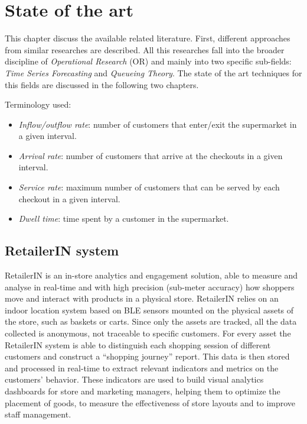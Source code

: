 \chapter{State of the art}
\label{cha:state_of_art}

This chapter discuss the available related literature. First, different approaches from similar researches are described. All this researches fall into the broader discipline of \emph{Operational Research} (OR) and mainly into two specific sub-fields: \emph{Time Series Forecasting} and \emph{Queueing Theory}. The state of the art techniques for this fields are discussed in the following two chapters.

Terminology used:
\begin{itemize}
  \item \emph{Inflow/outflow rate}: number of customers that enter/exit the supermarket in a given interval.
  \item \emph{Arrival rate}: number of customers that arrive at the checkouts in a given interval.
  \item \emph{Service rate}: maximum number of customers that can be served by each checkout in a given interval.
  \item \emph{Dwell time}: time spent by a customer in the supermarket.
\end{itemize}

\section{RetailerIN system}
\label{sec:retailerin_system}
RetailerIN is an in-store analytics and engagement solution, able to measure and analyse in real-time and with high precision (sub-meter accuracy) how shoppers move and interact with products in a physical store. RetailerIN relies on an indoor location system based on BLE sensors mounted on the physical assets of the store, such as baskets or carts. Since only the assets are tracked, all the data collected is anonymous, not traceable to specific customers. For every asset the RetailerIN system is able to distinguish each shopping session of different customers and construct a “shopping journey” report. This data is then stored and processed in real-time to extract relevant indicators and metrics on the customers’ behavior. These indicators are used to build visual analytics dashboards for store and marketing managers, helping them to optimize the placement of goods, to measure the effectiveness of store layouts and to improve staff management.

